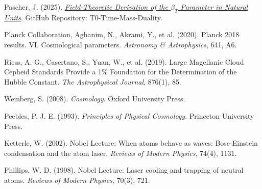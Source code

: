 \documentclass[12pt,a4paper]{article}
\begin{document}
	\begin{thebibliography}{99}
		Pascher, J. (2025). \href{https://github.com/jpascher/T0-Time-Mass-Duality/blob/main/2/pdf/DerivationVonBetaEn.pdf}{\textit{Field-Theoretic Derivation of the $\beta_T$ Parameter in Natural Units}}. GitHub Repository: T0-Time-Mass-Duality.
		
		Planck Collaboration, Aghanim, N., Akrami, Y., et al. (2020). Planck 2018 results. VI. Cosmological parameters. \textit{Astronomy \& Astrophysics}, 641, A6.
		
		Riess, A. G., Casertano, S., Yuan, W., et al. (2019). Large Magellanic Cloud Cepheid Standards Provide a 1\% Foundation for the Determination of the Hubble Constant. \textit{The Astrophysical Journal}, 876(1), 85.
		
		Weinberg, S. (2008). \textit{Cosmology}. Oxford University Press.
		
		Peebles, P. J. E. (1993). \textit{Principles of Physical Cosmology}. Princeton University Press.
		
		Ketterle, W. (2002). Nobel Lecture: When atoms behave as waves: Bose-Einstein condensation and the atom laser. \textit{Reviews of Modern Physics}, 74(4), 1131.
		
		Phillips, W. D. (1998). Nobel Lecture: Laser cooling and trapping of neutral atoms. \textit{Reviews of Modern Physics}, 70(3), 721.
	\end{thebibliography}
	
\end{document}
